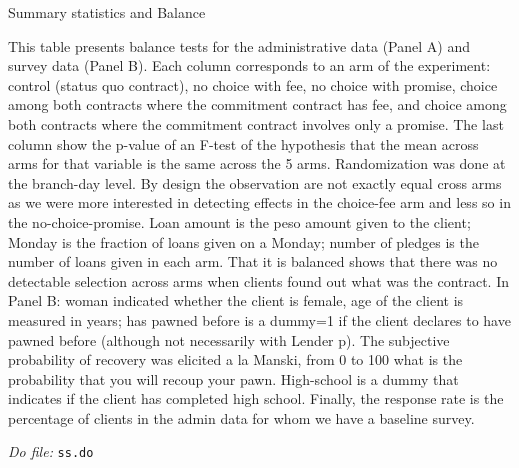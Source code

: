 \documentclass[11pt]{article}
\begin{document}
\begin{table}[H]
\caption{Summary statistics and Balance}
\label{SS}
\begin{center}
\scriptsize{}
\end{center}
 \scriptsize
This table presents balance tests for the administrative data (Panel A) and survey data (Panel B). Each column corresponds to an arm of the experiment: control (status quo contract), no choice with fee, no choice with promise, choice among both contracts where the commitment contract has fee, and choice among both contracts where the commitment contract involves only a promise. The last column show the p-value of an F-test of the hypothesis that the mean across arms for that variable is the same across the 5 arms. Randomization was done at the branch-day level. By design the observation are not exactly equal cross arms as we were more interested in detecting effects in the choice-fee arm and less so in the no-choice-promise. Loan amount is the peso amount given to the client; Monday is the fraction of loans given on a Monday; number of pledges is the number of loans given in each arm. That it is balanced shows that there was no detectable selection across arms when clients found out what was the contract. In Panel B: woman indicated whether the client is female, age of the client is measured in years; has pawned before is a dummy=1 if the client declares to have pawned before (although not necessarily with Lender p). The subjective probability of recovery was elicited a la Manski, from 0 to 100 what is the probability that you will recoup your pawn. High-school is a dummy that indicates if the client has completed high school. Finally, the response rate is the percentage of clients in the admin data for whom we have a baseline survey.

\textit{Do file: } \texttt{ss.do}
\end{table}


\pagebreak
\end{document}
